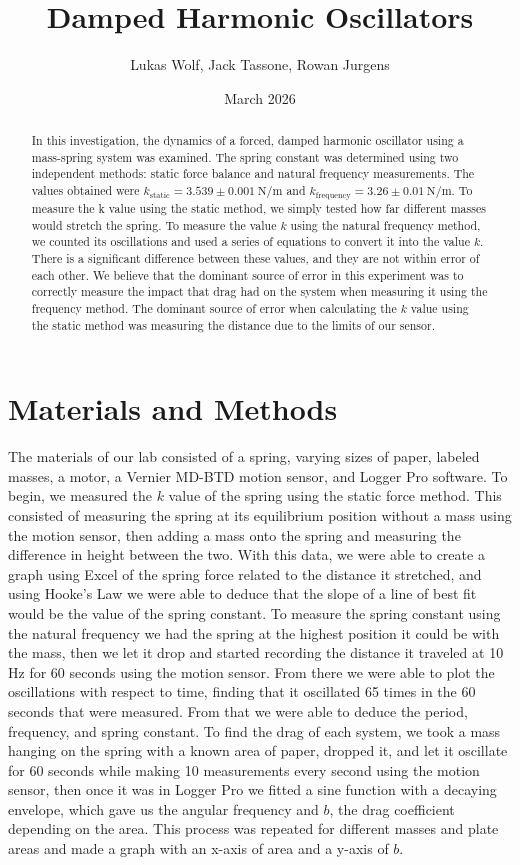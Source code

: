 \documentclass[12pt]{article}
\title{Damped Harmonic Oscillators}
\author{Lukas Wolf, Jack Tassone, Rowan Jurgens}
\date{March 2026}
\begin{document}
\maketitle

\begin{abstract}
    In this investigation, the dynamics of a forced, damped harmonic oscillator using a mass-spring system was examined. The spring constant was determined using two independent methods: static force balance and natural frequency measurements. The values obtained were $k_{\text{static}}=3.539 \pm 0.001~\unit{\newton\per\meter}$ and $k_{\text{frequency}}=3.26 \pm 0.01~\unit{\newton\per\meter}$. To measure the k value using the static method, we simply tested how far different masses would stretch the spring. To measure the value $k$ using the natural frequency method, we counted its oscillations and used a series of equations to convert it into the value $k$. There is a significant difference between these values, and they are not within error of each other. We believe that the dominant source of error in this experiment was to correctly measure the impact that drag had on the system when measuring it using the frequency method. The dominant source of error when calculating the $k$ value using the static method was measuring the distance due to the limits of our sensor. 
\end{abstract}

\newpage

\section{Materials and Methods}
The materials of our lab consisted of a spring, varying sizes of paper, labeled masses, a motor, a Vernier MD-BTD motion sensor, and Logger Pro software. To begin, we measured the $k$ value of the spring using the static force method. This consisted of measuring the spring at its equilibrium position without a mass using the motion sensor, then adding a mass onto the spring and measuring the difference in height between the two. With this data, we were able to create a graph using Excel of the spring force related to the distance it stretched, and using Hooke’s Law we were able to deduce that the slope of a line of best fit would be the value of the spring constant. To measure the spring constant using the natural frequency we had the spring at the highest position it could be with the mass, then we let it drop and started recording the distance it traveled at 10 Hz for 60 seconds using the motion sensor. From there we were able to plot the oscillations with respect to time, finding that it oscillated 65 times in the 60 seconds that were measured. From that we were able to deduce the period, frequency, and spring constant. To find the drag of each system, we took a mass hanging on the spring with a known area of paper, dropped it, and let it oscillate for 60 seconds while making 10 measurements every second using the motion sensor, then once it was in Logger Pro we fitted a sine function with a decaying envelope, which gave us the angular frequency and $b$, the drag coefficient depending on the area. This process was repeated for different masses and plate areas and made a graph with an x-axis of area and a y-axis of $b$.
\end{document}

